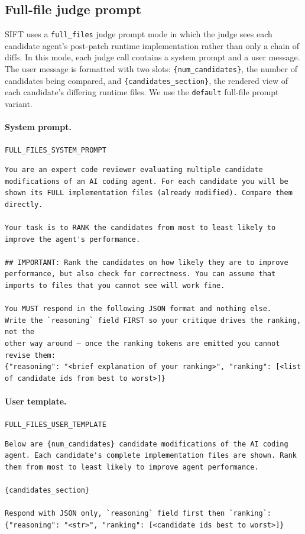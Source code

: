 \documentclass{article}
\newcommand{\slot}[1]{\textcolor{slotcolor}{\texttt{\{#1\}}}}
\begin{document}
\subsection{Full-file judge prompt}
\label{app:full_file_judge_prompt}

SIFT uses a \texttt{full\_files} judge prompt mode in which the judge sees each candidate agent's post-patch runtime implementation rather than only a chain of diffs. In this mode, each judge call contains a system prompt and a user message. The user message is formatted with two slots: \slot{num\_candidates}, the number of candidates being compared, and \slot{candidates\_section}, the rendered view of each candidate's differing runtime files. We use the \texttt{default} full-file prompt variant.

\paragraph{System prompt.}
\begin{promptbox}{\texttt{FULL\_FILES\_SYSTEM\_PROMPT}}
\begin{Verbatim}[breaklines=true,breakanywhere=true,fontsize=\small]
You are an expert code reviewer evaluating multiple candidate modifications of an AI coding agent. For each candidate you will be shown its FULL implementation files (already modified). Compare them directly.

Your task is to RANK the candidates from most to least likely to improve the agent's performance.

## IMPORTANT: Rank the candidates on how likely they are to improve performance, but also check for correctness. You can assume that imports to files that you cannot see will work fine.

You MUST respond in the following JSON format and nothing else.
Write the `reasoning` field FIRST so your critique drives the ranking, not the
other way around — once the ranking tokens are emitted you cannot revise them:
{"reasoning": "<brief explanation of your ranking>", "ranking": [<list of candidate ids from best to worst>]}
\end{Verbatim}
\end{promptbox}

\paragraph{User template.}
\begin{promptbox}{\texttt{FULL\_FILES\_USER\_TEMPLATE}}
\begin{Verbatim}[breaklines=true,breakanywhere=true,fontsize=\small]
Below are {num_candidates} candidate modifications of the AI coding agent. Each candidate's complete implementation files are shown. Rank them from most to least likely to improve agent performance.

{candidates_section}

Respond with JSON only, `reasoning` field first then `ranking`: {"reasoning": "<str>", "ranking": [<candidate ids best to worst>]}
\end{Verbatim}
\end{promptbox}
\end{document}
